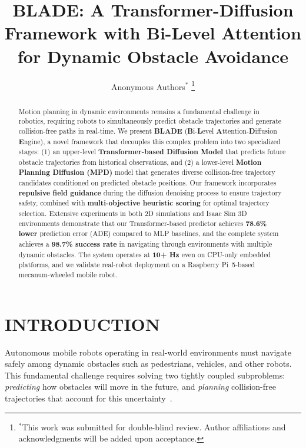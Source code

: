 \documentclass[letterpaper, 10 pt, conference]{ieeeconf}
\title{\LARGE \bf
BLADE: A Transformer-Diffusion Framework with Bi-Level Attention for Dynamic Obstacle Avoidance
}
\author{Anonymous Authors$^{*}$
\thanks{$^{*}$This work was submitted for double-blind review. Author affiliations and acknowledgments will be added upon acceptance.}
}
\begin{document}
\maketitle
\thispagestyle{empty}
\pagestyle{empty}

\begin{abstract}

Motion planning in dynamic environments remains a fundamental challenge in robotics, requiring robots to simultaneously predict obstacle trajectories and generate collision-free paths in real-time. We present \textbf{BLADE} (\textbf{B}i-\textbf{L}evel \textbf{A}ttention-\textbf{D}iffusion \textbf{E}ngine), a novel framework that decouples this complex problem into two specialized stages: (1) an upper-level \textbf{Transformer-based Diffusion Model} that predicts future obstacle trajectories from historical observations, and (2) a lower-level \textbf{Motion Planning Diffusion (MPD)} model that generates diverse collision-free trajectory candidates conditioned on predicted obstacle positions. Our framework incorporates \textbf{repulsive field guidance} during the diffusion denoising process to ensure trajectory safety, combined with \textbf{multi-objective heuristic scoring} for optimal trajectory selection. Extensive experiments in both 2D simulations and Isaac Sim 3D environments demonstrate that our Transformer-based predictor achieves \textbf{78.6\% lower} prediction error (ADE) compared to MLP baselines, and the complete system achieves a \textbf{98.7\% success rate} in navigating through environments with multiple dynamic obstacles. The system operates at \textbf{10+ Hz} even on CPU-only embedded platforms, and we validate real-robot deployment on a Raspberry Pi~5-based mecanum-wheeled mobile robot.

\end{abstract}

\section{INTRODUCTION}

Autonomous mobile robots operating in real-world environments must navigate safely among dynamic obstacles such as pedestrians, vehicles, and other robots. This fundamental challenge requires solving two tightly coupled subproblems: \textit{predicting} how obstacles will move in the future, and \textit{planning} collision-free trajectories that account for this uncertainty~\cite{salzmann2020trajectron++, giuliari2021transformer}.
\end{document}
